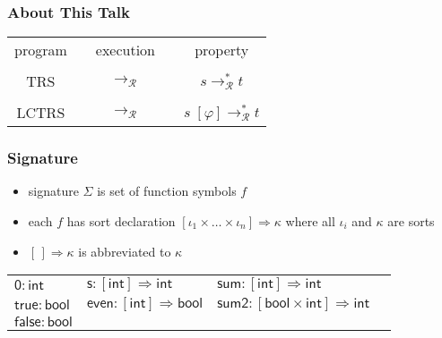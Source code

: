 \documentclass[12pt,aspectratio=169]{beamer}
\newcommand{\m}[1]{\mathsf{#1}}
\newcommand{\RR}{\mathcal{R}}
\begin{document}
\begin{frame}
    \frametitle{About This Talk}
    
    {\LARGE
    \begin{table}
        \centering
        \begin{tabular}{ccccc}
            program & & \pause execution & & \pause property \\\\ \pause
            TRS     & & $\to_\RR$ & & $s \to_\RR^* t$ \\\\ \pause
            \alert{LCTRS}   & & \alert{$\to_\RR$} & & $s \; [\varphi] \to_\RR^* t$
        \end{tabular}
    \end{table}
    }
\end{frame}

\begin{frame}
    \frametitle{Signature}
    \begin{definition}[signature]
        \begin{itemize}
        \item \alert{signature} $\Sigma$ is set of function symbols $f$
            \pause
        \item each $f$ has \alert{sort declaration}
            \pause
        $[\iota_1 \times \ldots \times \iota_n] \Rightarrow \kappa$
        where all $\iota_i$ and $\kappa$ are sorts
            \pause
        \item $[\,] \Rightarrow \kappa$ is abbreviated to $\kappa$
    \end{itemize}
    \end{definition}
    \pause
    \begin{example}
    \begin{tabular}{llll}
        $\m{0} : \m{int}$ & $\m{s} : [\m{int}] \Rightarrow \m{int}$ & $\m{sum} : [\m{int}] \Rightarrow \m{int}$ \\
        $\m{true} : \m{bool}$ & $\m{even} : [\m{int}] \Rightarrow \m{bool}$ & $\m{sum2} : [\m{bool} \times \m{int}] \Rightarrow \m{int}$\\
        $\m{false} : \m{bool}$ & &
    \end{tabular}
    \end{example}
\end{frame}
\end{document}
